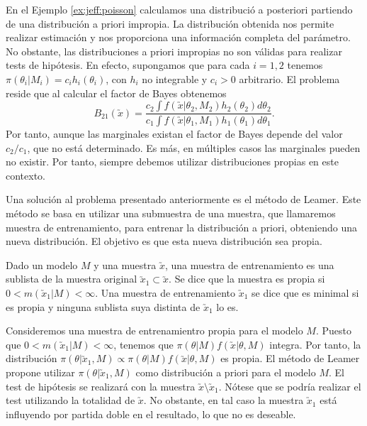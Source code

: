 	En el Ejemplo \ref{ex:jeff:poisson} calculamos una distribució a posteriori partiendo de una distribución a priori impropia. La distribución obtenida nos permite realizar estimación y nos proporciona una información completa del parámetro. No obstante, las distribuciones a priori impropias no son válidas para realizar tests de hipótesis. En efecto, supongamos que para cada $i = 1,2$ tenemos $\pi(\theta_i|M_i) = c_ih_i(\theta_i)$, con $h_i$ no integrable y $c_i > 0$ arbitrario. El problema reside que al calcular el factor de Bayes obtenemos
    \[B_{21}(\utilde{x}) = \frac{c_2 \int{f(\utilde{x} | \theta_2 , M_2)h_2(\theta_2) d\theta_2}}{c_1 \int{f(\utilde{x} | \theta_1 , M_1) h_1(\theta_1) d\theta_1}}.\]
    Por tanto, aunque las marginales existan el factor de Bayes depende del valor $c_2 / c_1$, que no está determinado. Es más, en múltiples casos las marginales pueden no existir. Por tanto, siempre debemos utilizar distribuciones propias en este contexto.

	Una solución al problema presentado anteriormente es el método de Leamer. Este método se basa en utilizar una submuestra de una muestra, que llamaremos muestra de entrenamiento, para entrenar la distribución a priori, obteniendo una nueva distribución. El objetivo es que esta nueva distribución sea propia. %

	\begin{definition}
		Dado un modelo $M$ y una muestra $\utilde{x}$, una muestra de entrenamiento es una sublista de la muestra original $\utilde{x}_1 \subset \utilde{x}$. Se dice que la muestra es propia si $0 < m(\utilde{x}_1|M) < \infty$. Una muestra de entrenamiento $\utilde{x}_1$ se dice que es minimal si es propia y ninguna sublista suya distinta de $\utilde{x}_1$ lo es.
	\end{definition}

	Consideremos una muestra de entrenamientro propia para el modelo $M$. Puesto que $0 < m(\utilde{x}_1|M) < \infty$, tenemos que $\pi(\theta | M) f(\utilde{x} | \theta, M)$ integra. Por tanto, la distribución $\pi(\theta | \utilde{x}_1, M) \propto \pi(\theta | M) f(\utilde{x} | \theta, M)$ es propia. El método de Leamer propone utilizar $\pi(\theta | \utilde{x}_1, M)$ como distribución a priori para el modelo $M$. El test de hipótesis se realizará con la muestra $\utilde{x} \setminus \utilde{x}_1$. Nótese que se podría realizar el test utilizando la totalidad de $\utilde{x}$. No obstante, en tal caso la muestra $\utilde{x}_1$ está influyendo por partida doble en el resultado, lo que no es deseable.


